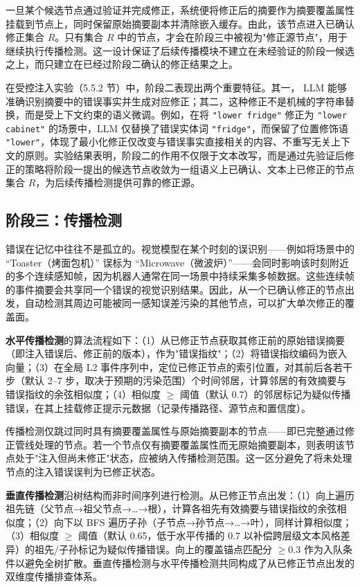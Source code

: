 一旦某个候选节点通过验证并完成修正，系统便将修正后的摘要作为摘要覆盖属性挂载到节点上，同时保留原始摘要副本并清除嵌入缓存。由此，该节点进入已确认修正集合 $R$。只有集合 $R$ 中的节点，才会在阶段三中被视为"修正源节点"，用于继续执行传播检测。这一设计保证了后续传播模块不建立在未经验证的阶段一候选之上，而只建立在已经过阶段二确认的修正结果之上。

在受控注入实验（5.5.2 节）中，阶段二表现出两个重要特征。其一， LLM 能够准确识别摘要中的错误事实并生成对应修正；其二，这种修正不是机械的字符串替换，而是受上下文约束的语义微调。例如，在将 \texttt{"lower fridge"} 修正为 \texttt{"lower cabinet"} 的场景中，LLM 仅替换了错误实体词 \texttt{"fridge"}，而保留了位置修饰语 \texttt{"lower"}，体现了最小化修正仅改变与错误事实直接相关的内容、不重写无关上下文的原则。实验结果表明，阶段二的作用不仅限于文本改写，而是通过先验证后修正的策略将阶段一提出的候选节点收敛为一组语义上已确认、文本上已修正的节点集合 $R$，为后续传播检测提供可靠的修正源。

\subsection{阶段三：传播检测}

错误在记忆中往往不是孤立的。视觉模型在某个时刻的误识别——例如将场景中的 “Toaster（烤面包机）” 误标为 “Microwave（微波炉）”——会同时影响该时刻附近的多个连续感知帧，因为机器人通常在同一场景中持续采集多帧数据。这些连续帧的事件摘要会共享同一个错误的视觉识别结果。因此，从一个已确认修正的节点出发，自动检测其周边可能被同一感知误差污染的其他节点，可以扩大单次修正的覆盖面。

\textbf{水平传播检测}的算法流程如下：（1）从已修正节点获取其修正前的原始错误摘要（即注入错误后、修正前的版本），作为"错误指纹"；（2）将错误指纹编码为嵌入向量；（3）在全局 L2 事件序列中，定位已修正节点的索引位置，对其前后各若干步（默认 2–7 步，取决于预期的污染范围）个时间邻居，计算邻居的有效摘要与错误指纹的余弦相似度；（4）相似度 $\ge$ 阈值（默认 0.7）的邻居标记为疑似传播错误，在其上挂载修正提示元数据（记录传播路径、源节点和置信度）。

传播检测仅跳过同时具有摘要覆盖属性与原始摘要副本的节点——即已完整通过修正管线处理的节点。若一个节点仅有摘要覆盖属性而无原始摘要副本，则表明该节点处于"注入但尚未修正"状态，应被纳入传播检测范围。这一区分避免了将未处理节点的注入错误误判为已修正状态。

\textbf{垂直传播检测}沿树结构而非时间序列进行检测。从已修正节点出发：（1）向上遍历祖先链（父节点→祖父节点→…→根），计算各祖先有效摘要与错误指纹的余弦相似度；（2）向下以 BFS 遍历子孙（子节点→孙节点→…→叶），同样计算相似度；（3）相似度 $\ge$ 阈值（默认 0.65，低于水平传播的 0.7 以补偿跨层级文本风格差异）的祖先/子孙标记为疑似传播错误。向上的覆盖锚点匹配分 $\ge 0.3$ 作为入队条件以避免全树扩散。垂直传播检测与水平传播检测共同构成了从已修正节点出发的双维度传播排查体系。

